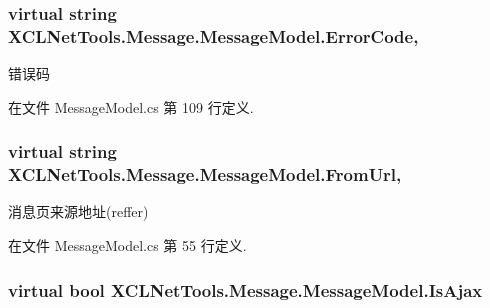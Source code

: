 \subsubsection[{\texorpdfstring{Error\+Code}{ErrorCode}}]{\setlength{\rightskip}{0pt plus 5cm}virtual string X\+C\+L\+Net\+Tools.\+Message.\+Message\+Model.\+Error\+Code\hspace{0.3cm}{\ttfamily [get]}, {\ttfamily [set]}}\hypertarget{class_x_c_l_net_tools_1_1_message_1_1_message_model_ab169d7bab20868e935d775459b72e625}{}\label{class_x_c_l_net_tools_1_1_message_1_1_message_model_ab169d7bab20868e935d775459b72e625}


错误码 



在文件 Message\+Model.\+cs 第 109 行定义.

\subsubsection[{\texorpdfstring{From\+Url}{FromUrl}}]{\setlength{\rightskip}{0pt plus 5cm}virtual string X\+C\+L\+Net\+Tools.\+Message.\+Message\+Model.\+From\+Url\hspace{0.3cm}{\ttfamily [get]}, {\ttfamily [set]}}\hypertarget{class_x_c_l_net_tools_1_1_message_1_1_message_model_a36e0a2784c189c86b33b76ceca539a28}{}\label{class_x_c_l_net_tools_1_1_message_1_1_message_model_a36e0a2784c189c86b33b76ceca539a28}


消息页来源地址(reffer) 



在文件 Message\+Model.\+cs 第 55 行定义.

\subsubsection[{\texorpdfstring{Is\+Ajax}{IsAjax}}]{\setlength{\rightskip}{0pt plus 5cm}virtual bool X\+C\+L\+Net\+Tools.\+Message.\+Message\+Model.\+Is\+Ajax\hspace{0.3cm}{\ttfamily [get]}}\hypertarget{class_x_c_l_net_tools_1_1_message_1_1_message_model_a1ea24cc20f05516f6266af92cc06479a}{}\label{class_x_c_l_net_tools_1_1_message_1_1_message_model_a1ea24cc20f05516f6266af92cc06479a}


